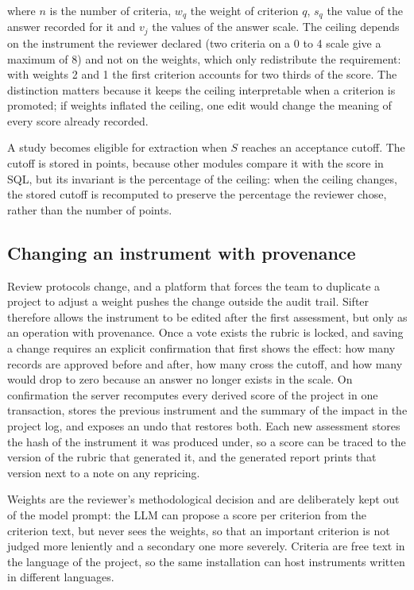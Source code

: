where $n$ is the number of criteria, $w_q$ the weight of criterion $q$, $s_q$
the value of the answer recorded for it and $v_j$ the values of the answer
scale. The ceiling depends on the instrument the reviewer declared (two
criteria on a 0 to 4 scale give a maximum of 8) and not on the weights, which
only redistribute the requirement: with weights 2 and 1 the first criterion
accounts for two thirds of the score. The distinction matters because it keeps
the ceiling interpretable when a criterion is promoted; if weights inflated
the ceiling, one edit would change the meaning of every score already
recorded.

A study becomes eligible for extraction when $S$ reaches an acceptance cutoff.
The cutoff is stored in points, because other modules compare it with the score
in SQL, but its invariant is the percentage of the ceiling: when the ceiling
changes, the stored cutoff is recomputed to preserve the percentage the
reviewer chose, rather than the number of points.

\subsection{Changing an instrument with provenance}\label{sec:repricing}

Review protocols change, and a platform that forces the team to duplicate a
project to adjust a weight pushes the change outside the audit trail. Sifter
therefore allows the instrument to be edited after the first assessment, but
only as an operation with provenance. Once a vote exists the rubric is locked,
and saving a change requires an explicit confirmation that first shows the
effect: how many records are approved before and after, how many cross the
cutoff, and how many would drop to zero because an answer no longer exists in
the scale. On confirmation the server recomputes every derived score of the
project in one transaction, stores the previous instrument and the summary of
the impact in the project log, and exposes an undo that restores both. Each new
assessment stores the hash of the instrument it was produced under, so a score
can be traced to the version of the rubric that generated it, and the generated
report prints that version next to a note on any repricing.

Weights are the reviewer's methodological decision and are deliberately kept
out of the model prompt: the LLM can propose a score per criterion from the
criterion text, but never sees the weights, so that an important criterion is
not judged more leniently and a secondary one more severely. Criteria are free
text in the language of the project, so the same installation can host
instruments written in different languages.

